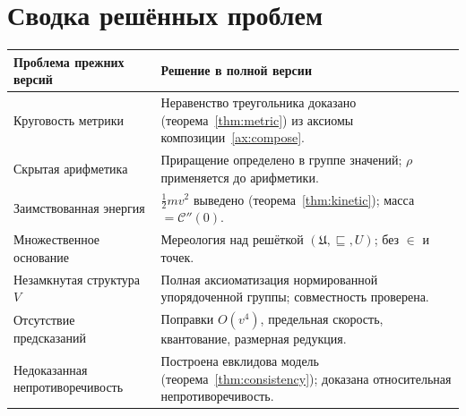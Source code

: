 \documentclass[12pt,a4paper,oneside]{book}
\theoremstyle{definition}
\theoremstyle{plain}
\theoremstyle{remark}
\newcommand{\Whole}{U}
\newcommand{\Values}{V}
\newcommand{\PartOf}{\sqsubseteq}
\newcommand{\norm}{\rho}
\newcommand{\Cost}{\mathcal C}
\begin{document}
\backmatter

\chapter*{Сводка решённых проблем}

\begin{center}
\renewcommand{\arraystretch}{1.4}
\begin{tabular}{>{\raggedright\arraybackslash}p{}>{\raggedright\arraybackslash}p{}}
\toprule
\textbf{Проблема прежних версий} & \textbf{Решение в полной версии} \\
\midrule
Круговость метрики & Неравенство треугольника доказано (теорема~\ref{thm:metric}) из
аксиомы композиции~\ref{ax:compose}. \\
Скрытая арифметика & Приращение определено в группе значений; $\norm$ применяется до
арифметики. \\
Заимствованная энергия & $\tfrac12 mv^2$ выведено (теорема~\ref{thm:kinetic}); масса
$=\Cost''(0)$. \\
Множественное основание & Мереология над решёткой $(\mathfrak U,\PartOf,\Whole)$;
без $\in$ и точек. \\
Незамкнутая структура $\Values$ & Полная аксиоматизация нормированной упорядоченной
группы; совместность проверена. \\
Отсутствие предсказаний & Поправки $O(v^4)$, предельная скорость, квантование,
размерная редукция. \\
Недоказанная непротиворечивость & Построена евклидова модель
(теорема~\ref{thm:consistency}); доказана относительная непротиворечивость. \\
\bottomrule
\end{tabular}
\end{center}
\end{document}
